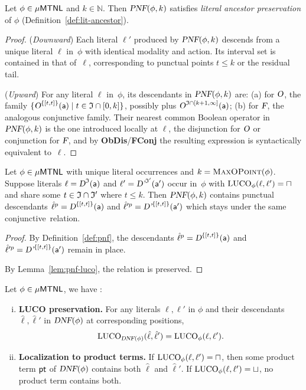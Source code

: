 \begin{lemma}\label{lem:pnf-ancestor}
Let $\phi\in\mathsf{\mu MTNL}$ and $k\in\mathbb{N}$. Then $\textsl{PNF}(\phi,k)$ satisfies
\emph{literal ancestor preservation} of $\phi$ (Definition~\ref{def:lit-ancestor}).
\end{lemma}

\begin{proof}
(\emph{Downward}) Each literal $\ell'$ produced by $\textsl{PNF}(\phi,k)$ descends from a unique
literal $\ell$ in~$\phi$ with identical modality and action. Its interval set is contained
in that of~$\ell$, corresponding to punctual points $t\le k$ or the residual tail.

(\emph{Upward}) For any literal $\ell$ in~$\phi$, its descendants in $\textsl{PNF}(\phi,k)$ are:
(a) for $\textsl{O}$, the family
$\{\textsl{O}^{\{[t,t]\}}(\mathsf{a})\mid t\in\mathfrak{I}\cap[0,k]\}$, possibly plus
$\textsl{O}^{\mathfrak{I}\cap[k{+}1,\infty]}(\mathsf{a})$;
(b) for $\textsl{F}$, the analogous conjunctive family.
Their nearest common Boolean operator in $\textsl{PNF}(\phi,k)$ is the one introduced locally at
$\ell$, the disjunction for $\textsl{O}$ or conjunction for $\textsl{F}$, and by
\textbf{ObDis}/\textbf{FConj} the resulting expression is syntactically equivalent to~$\ell$.
\end{proof}

\begin{lemma}\label{lem:witness-punct-pnf}
Let $\phi\in\mathsf{\mu MTNL}$ with unique literal occurrences and
$k=\textsc{MaxOPoint}(\phi)$. Suppose literals
$\ell=\textsl{D}^{\mathfrak{I}}(\mathsf{a})$ and $\ell'=\textsl{D'}^{\mathfrak{I}'}(\mathsf{a'})$
occur in~$\phi$ with $\mathrm{LUCO}_\phi(\ell,\ell')=\sqcap$ and share some
$t\in\mathfrak{I}\cap\mathfrak{I}'$ where $t\le k$. Then $\textsl{PNF}(\phi,k)$ contains punctual descendants
$\hat\ell^p=\textsl{D}^{\{[t,t]\}}(\mathsf{a})$ and
$\hat\ell^{\prime p}=\textsl{D'}^{\{[t,t]\}}(\mathsf{a'})$
which stays under the same conjunctive~\LUCO relation.
\end{lemma}

\begin{proof}

By Definition~\ref{def:pnf}, the descendants $\hat\ell^p=\textsl{D}^{\{[t,t]\}}(\mathsf{a})$ and
$\hat\ell^{\prime p}=\textsl{D'}^{\{[t,t]\}}(\mathsf{a'})$ remain in place.

 By Lemma~\ref{lem:pnf-luco}, the \LUCO relation is preserved.
\end{proof}

\begin{lemma}\label{lem:dnf-luco}
Let $\phi\in\mathsf{\mu MTNL}$, we have :
\begin{enumerate}[(i)]
\item \textbf{LUCO preservation.}  
For any literals $\ell,\ell'$ in $\phi$ and their descendants
$\hat\ell,\hat\ell'$ in $\textsl{DNF}(\phi)$ at corresponding positions,
\[
\mathrm{LUCO}_{\textsl{DNF}(\phi)}(\hat\ell,\hat\ell')=\mathrm{LUCO}_\phi(\ell,\ell').
\]
\item \textbf{Localization to product terms.}  
If $\mathrm{LUCO}_\phi(\ell,\ell')=\sqcap$, then some product term $\mathsf{pt}$ of $\textsl{DNF}(\phi)$ contains
both $\hat\ell$ and $\hat\ell'$.  
If $\mathrm{LUCO}_\phi(\ell,\ell')=\sqcup$, no product term contains both.
\end{enumerate}
\end{lemma}

